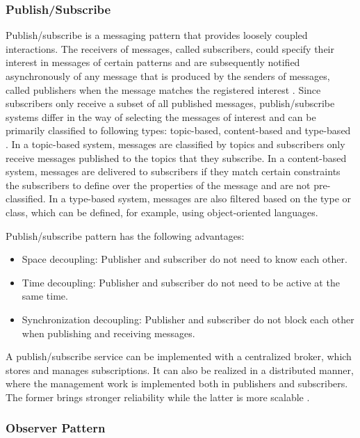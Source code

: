 \subsubsection{Publish/Subscribe}

Publish/subscribe is a messaging pattern that provides loosely coupled interactions. The receivers of messages, called subscribers, could specify their interest in messages of certain patterns and are subsequently notified asynchronously of any message that is produced by the senders of messages, called publishers when the message matches the registered interest \autocite{6918928}. Since subscribers only receive a subset of all published messages, publish/subscribe systems differ in the way of selecting the messages of interest and can be primarily classified to following types:  topic-based, content-based and type-based \autocite{Eugster:2003:MFP:857076.857078}. In a topic-based system, messages are classified by topics and subscribers only receive messages published to the topics that they subscribe. In a content-based system, messages are delivered to subscribers if they match certain constraints the subscribers to define over the properties of the message and are not pre-classified. In a type-based system, messages are also filtered based on the type or class, which can be defined, for example, using object-oriented languages.

Publish/subscribe pattern has the following advantages:

\begin{itemize}
\item Space decoupling: Publisher and subscriber do not need to know each other.
\item Time decoupling: Publisher and subscriber do not need to be active at the same time.
\item Synchronization decoupling: Publisher and subscriber do not block each other when publishing and receiving messages.
\end{itemize}

A publish/subscribe service can be implemented with a centralized broker, which stores and manages subscriptions. It can also be realized in a distributed manner, where the management work is implemented both in publishers and subscribers. The former brings stronger reliability while the latter is more scalable \autocite{Eugster:2003:MFP:857076.857078}.

\subsubsection{Observer Pattern}

